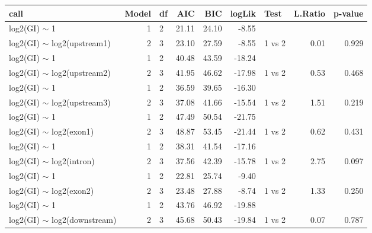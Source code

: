 \begin{table}[ht]
\centering
\begin{tabular}{lrlrrrlrr}
  \hline
call & Model & df & AIC & BIC & logLik & Test & L.Ratio & p-value \\ 
  \hline
log2(GI) $\sim$ 1 &  1 & 2 & 21.11 & 24.10 & -8.55 &  &  &  \\ 
  log2(GI) $\sim$ log2(upstream1) &  2 & 3 & 23.10 & 27.59 & -8.55 & 1 vs 2 & 0.01 & 0.929 \\ 
   \hline
log2(GI) $\sim$ 1 &  1 & 2 & 40.48 & 43.59 & -18.24 &  &  &  \\ 
  log2(GI) $\sim$ log2(upstream2) &  2 & 3 & 41.95 & 46.62 & -17.98 & 1 vs 2 & 0.53 & 0.468 \\ 
   \hline
log2(GI) $\sim$ 1 &  1 & 2 & 36.59 & 39.65 & -16.30 &  &  &  \\ 
  log2(GI) $\sim$ log2(upstream3) &  2 & 3 & 37.08 & 41.66 & -15.54 & 1 vs 2 & 1.51 & 0.219 \\ 
   \hline
log2(GI) $\sim$ 1 &  1 & 2 & 47.49 & 50.54 & -21.75 &  &  &  \\ 
  log2(GI) $\sim$ log2(exon1) &  2 & 3 & 48.87 & 53.45 & -21.44 & 1 vs 2 & 0.62 & 0.431 \\ 
   \hline
log2(GI) $\sim$ 1 &  1 & 2 & 38.31 & 41.54 & -17.16 &  &  &  \\ 
  log2(GI) $\sim$ log2(intron) &  2 & 3 & 37.56 & 42.39 & -15.78 & 1 vs 2 & 2.75 & 0.097 \\ 
   \hline
log2(GI) $\sim$ 1 &  1 & 2 & 22.81 & 25.74 & -9.40 &  &  &  \\ 
  log2(GI) $\sim$ log2(exon2) &  2 & 3 & 23.48 & 27.88 & -8.74 & 1 vs 2 & 1.33 & 0.250 \\ 
   \hline
log2(GI) $\sim$ 1 &  1 & 2 & 43.76 & 46.92 & -19.88 &  &  &  \\ 
  log2(GI) $\sim$ log2(downstream) &  2 & 3 & 45.68 & 50.43 & -19.84 & 1 vs 2 & 0.07 & 0.787 \\ 
   \hline
\end{tabular}
\end{table}
